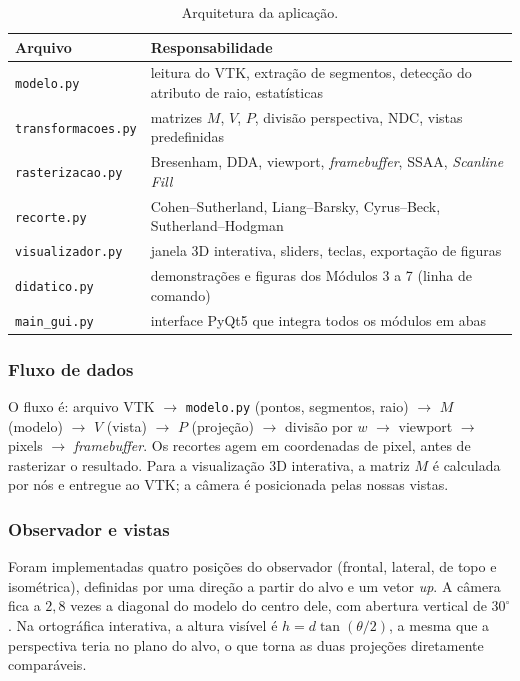 \documentclass[11pt, a4paper]{article}
\newcommand{\arq}[1]{\texttt{#1}}
\begin{document}
\begin{table}[htbp]
\centering\small
\begin{tabular}{@{}lp{9.5cm}@{}}
\toprule
\textbf{Arquivo} & \textbf{Responsabilidade}\\
\midrule
\arq{modelo.py} & leitura do VTK, extração de segmentos, detecção do atributo de raio, estatísticas\\
\arq{transformacoes.py} & matrizes $M$, $V$, $P$, divisão perspectiva, NDC, vistas predefinidas\\
\arq{rasterizacao.py} & Bresenham, DDA, viewport, \emph{framebuffer}, SSAA, \emph{Scanline Fill}\\
\arq{recorte.py} & Cohen--Sutherland, Liang--Barsky, Cyrus--Beck, Sutherland--Hodgman\\
\arq{visualizador.py} & janela 3D interativa, sliders, teclas, exportação de figuras\\
\arq{didatico.py} & demonstrações e figuras dos Módulos 3 a 7 (linha de comando)\\
\arq{main\_gui.py} & interface PyQt5 que integra todos os módulos em abas\\
\bottomrule
\end{tabular}
\caption{Arquitetura da aplicação.}\label{tab:modulos}
\end{table}

\subsubsection{Fluxo de dados}
O fluxo é: arquivo VTK $\to$ \arq{modelo.py} (pontos, segmentos, raio) $\to$ $M$ (modelo)
$\to$ $V$ (vista) $\to$ $P$ (projeção) $\to$ divisão por $w$ $\to$ viewport $\to$ pixels
$\to$ \emph{framebuffer}. Os recortes agem em coordenadas de pixel, antes de
rasterizar o resultado. Para a visualização 3D interativa, a matriz $M$ é calculada
por nós e entregue ao VTK; a câmera é posicionada pelas nossas vistas.

\subsubsection{Observador e vistas}
Foram implementadas quatro posições do observador (frontal, lateral, de topo e
isométrica), definidas por uma direção a partir do alvo e um vetor \emph{up}. A câmera fica
a $2{,}8$ vezes a diagonal do modelo do centro dele, com abertura vertical de
$30^\circ$. Na ortográfica interativa, a altura visível é $h=d\tan(\theta/2)$, a mesma que a perspectiva teria no
plano do alvo, o que torna as duas projeções diretamente comparáveis.
\end{document}
